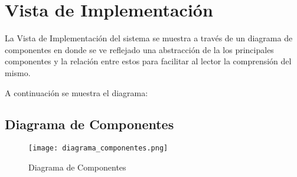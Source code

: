 \section{Vista de Implementación} \label{vistaImplementacion}
La Vista de Implementación del sistema se muestra a través de un diagrama de componentes en donde se ve reflejado una abstracción de la los principales componentes y la relación entre estos para facilitar al lector la comprensión del mismo.

A continuación se muestra el diagrama:

\subsection{Diagrama de Componentes}

\begin{figure}[H]
   \texttt{[image: diagrama\_componentes.png]}
   \caption{Diagrama de Componentes}
   \label{fig:diagrama_componentes}
   \centering
\end{figure}